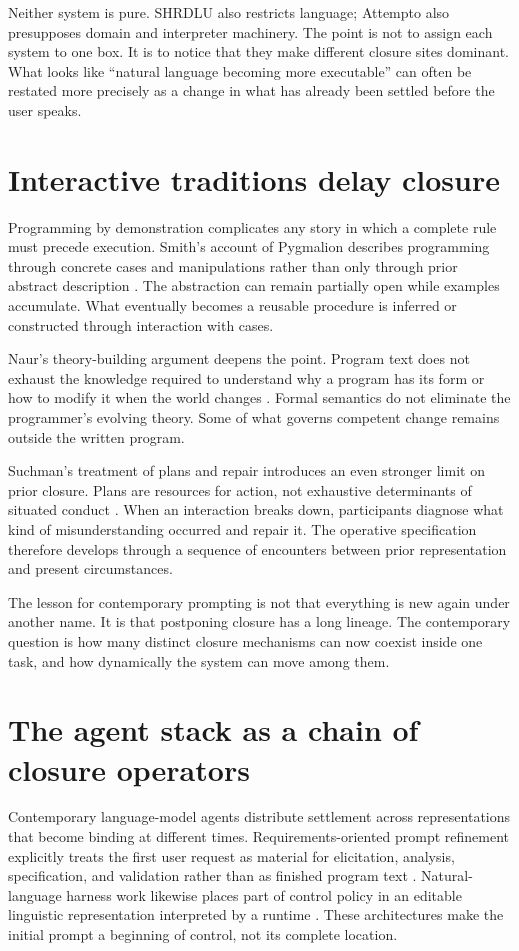 \documentclass[11pt]{article}
\begin{document}
Neither system is pure. SHRDLU also restricts language; Attempto also presupposes domain and interpreter machinery. The point is not to assign each system to one box. It is to notice that they make different closure sites dominant. What looks like ``natural language becoming more executable'' can often be restated more precisely as a change in what has already been settled before the user speaks.

\section{Interactive traditions delay closure}
Programming by demonstration complicates any story in which a complete rule must precede execution. Smith's account of Pygmalion describes programming through concrete cases and manipulations rather than only through prior abstract description \parencite{smith1993pygmalion}. The abstraction can remain partially open while examples accumulate. What eventually becomes a reusable procedure is inferred or constructed through interaction with cases.

Naur's theory-building argument deepens the point. Program text does not exhaust the knowledge required to understand why a program has its form or how to modify it when the world changes \parencite{naur1985programming}. Formal semantics do not eliminate the programmer's evolving theory. Some of what governs competent change remains outside the written program.

Suchman's treatment of plans and repair introduces an even stronger limit on prior closure. Plans are resources for action, not exhaustive determinants of situated conduct \parencite{suchman1985plans}. When an interaction breaks down, participants diagnose what kind of misunderstanding occurred and repair it. The operative specification therefore develops through a sequence of encounters between prior representation and present circumstances.

The lesson for contemporary prompting is not that everything is new again under another name. It is that postponing closure has a long lineage. The contemporary question is how many distinct closure mechanisms can now coexist inside one task, and how dynamically the system can move among them.

\section{The agent stack as a chain of closure operators}
Contemporary language-model agents distribute settlement across representations that become binding at different times. Requirements-oriented prompt refinement explicitly treats the first user request as material for elicitation, analysis, specification, and validation rather than as finished program text \parencite{shi2026reprompt}. Natural-language harness work likewise places part of control policy in an editable linguistic representation interpreted by a runtime \parencite{pan2026nlah}. These architectures make the initial prompt a beginning of control, not its complete location.
\end{document}
